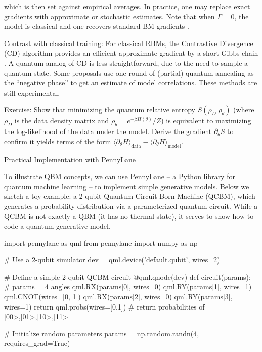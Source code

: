 which is then set against empirical averages.  In practice, one may replace exact gradients with approximate or stochastic estimates.  Note that when $\Gamma=0$, the model is classical and one recovers standard BM gradients .



Contrast with classical training:  For classical RBMs, the Contrastive Divergence (CD) algorithm provides an efficient approximate gradient by a short Gibbs chain . A quantum analog of CD is less straightforward, due to the need to sample a quantum state. Some proposals use one round of (partial) quantum annealing as the “negative phase” to get an estimate of model correlations. These methods are still experimental.



Exercise: Show that minimizing the quantum relative entropy $S(\rho_D|\rho_\theta)$ (where $\rho_D$ is the data density matrix and $\rho_\theta=e^{-\beta H(\theta)}/Z$) is equivalent to maximizing the log-likelihood of the data under the model. Derive the gradient $\partial_\theta S$ to confirm it yields terms of the form $\langle \partial_\theta H \rangle_{\text{data}} - \langle \partial_\theta H \rangle_{\text{model}}$. 





Practical Implementation with PennyLane





To illustrate QBM concepts, we can use PennyLane – a Python library for quantum machine learning – to implement simple generative models. Below we sketch a toy example: a 2-qubit Quantum Circuit Born Machine (QCBM), which generates a probability distribution via a parameterized quantum circuit. While a QCBM is not exactly a QBM (it has no thermal state), it serves to show how to code a quantum generative model.

import pennylane as qml
from pennylane import numpy as np

# Use a 2-qubit simulator
dev = qml.device('default.qubit', wires=2)

# Define a simple 2-qubit QCBM circuit
@qml.qnode(dev)
def circuit(params):
    # params = 4 angles
    qml.RX(params[0], wires=0)
    qml.RY(params[1], wires=1)
    qml.CNOT(wires=[0, 1])
    qml.RX(params[2], wires=0)
    qml.RY(params[3], wires=1)
    return qml.probs(wires=[0,1])  # return probabilities of |00>,|01>,|10>,|11>

# Initialize random parameters
params = np.random.randn(4, requires_grad=True)

